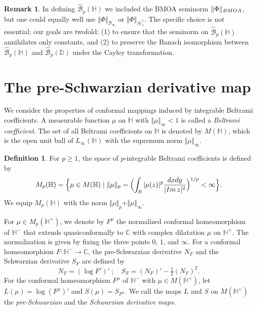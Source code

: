 \documentclass[amstex,12pt,reqno]{amsart}
\theoremstyle{definition}
\newtheorem{definition}{Definition}
\newtheorem{remark}{Remark}
\begin{document}
\begin{remark}\label{normsupply}
In defining $\widehat{\mathcal B}_p(\mathbb H)$ we included the BMOA seminorm $\Vert \Phi \Vert_{\rm BMOA}$,
but one could equally well use $\Vert \Phi \Vert_{\mathcal B_\infty}$ or $\Vert \Phi \Vert_{\dot{\mathcal H}_1^1}$.
The specific choice is not essential; our goals are twofold:
(1) to ensure that the seminorm on $\widehat{\mathcal B}_p(\mathbb H)$ annihilates only constants, and
(2) to preserve the Banach isomorphism between 
$\widehat{\mathcal B}_p(\mathbb H)$ and $\widehat{\mathcal B}_p(\mathbb D)$ 
under the Cayley transformation.
\end{remark}



\section{The pre-Schwarzian derivative map}\label{3}

We consider the properties of conformal mappings induced by integrable Beltrami coefficients.
A measurable function $\mu$ on $\mathbb H$ with $\Vert \mu \Vert_\infty<1$ is called 
a {\it Beltrami coefficient}. The set of all Beltrami coefficients on $\mathbb H$ is denoted by
$M(\mathbb H)$, which is the open unit ball of $L_\infty(\mathbb H)$ with 
the supremum norm $\Vert \mu \Vert_\infty$. 

\begin{definition}
For $p \geq 1$, the space of $p$-integrable
Beltrami coefficients is defined by
$$
M_p(\mathbb H)=\Bigl\{\mu \in M(\mathbb H) \mid 
\Vert \mu \Vert_p=\Bigl(\int_{\mathbb H} |\mu(z)|^p\frac{dxdy}{|{\rm Im}\,z|^2}\Bigr)^{1/p}<\infty\Bigr\}.
$$ 
We equip $M_p(\mathbb H)$ with the norm $\Vert \mu \Vert_p+\Vert \mu \Vert_\infty$.
\end{definition}

For $\mu \in M_p(\mathbb H^+)$, we denote by $F^\mu$ the normalized conformal homeomorphism of $\mathbb H^-$ that extends quasiconformally to $\mathbb C$ with complex dilatation $\mu$ on $\mathbb H^+$. 
The normalization is given by fixing
the three points $0$, $1$, and $\infty$. For a conformal homeomorphism $F:\mathbb H^- \to \mathbb C$,
the pre-Schwarzian derivative $N_F$ and the Schwarzian derivative $S_F$ are defined by
$$
N_F=(\log F')'\ ; \quad S_F=(N_F)'-\tfrac12(N_F)^2.
$$
For the conformal homeomorphism $F^\mu$ of $\mathbb H^-$ with $\mu \in M(\mathbb H^+)$,
let $L(\mu)=\log (F^\mu)'$ and $S(\mu)=S_{F^\mu}$. We call the maps $L$ and $S$ on $M(\mathbb H^+)$
the {\it pre-Schwarzian} and the {\it Schwarzian derivative maps}.
\end{document}
